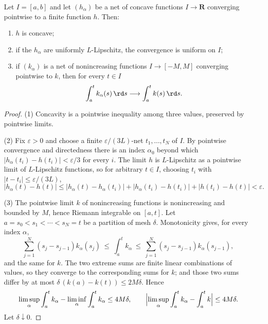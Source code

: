 \begin{lemma}
\label{lem:ch27-concave-nets}
Let \(I=[a,b]\) and let \((h_\alpha)\) be a net of concave functions
\(I\to\mathbf R\) converging pointwise to a finite function \(h\).  Then:
\begin{enumerate}
\item \(h\) is concave;
\item if the \(h_\alpha\) are uniformly \(L\)-Lipschitz, the convergence is
uniform on \(I\);
\item if \((k_\alpha)\) is a net of nonincreasing functions
\(I\to[-M,M]\) converging pointwise to \(k\), then for every
\(t\in I\)
\begin{equation}\label{eq:ch27-helly-integral}
 \int_a^tk_\alpha(s)\,\rd s\longrightarrow\int_a^tk(s)\,\rd s .
\end{equation}
\end{enumerate}
\end{lemma}

\begin{proof}
(1) Concavity is a pointwise inequality among three values, preserved by
pointwise limits.

(2) Fix \(\varepsilon>0\) and choose a finite \(\varepsilon/(3L)\)-net
\(t_1,\dots,t_N\) of \(I\).  By pointwise convergence and directedness there
is an index \(\alpha_0\) beyond which \(|h_\alpha(t_i)-h(t_i)|<\varepsilon/3\)
for every \(i\).  The limit \(h\) is \(L\)-Lipschitz as a pointwise limit of
\(L\)-Lipschitz functions, so for arbitrary \(t\in I\), choosing \(t_i\)
with \(|t-t_i|\leq\varepsilon/(3L)\),
\[
 |h_\alpha(t)-h(t)|
 \leq|h_\alpha(t)-h_\alpha(t_i)|+|h_\alpha(t_i)-h(t_i)|+|h(t_i)-h(t)|
 <\varepsilon .
\]

(3) The pointwise limit \(k\) of nonincreasing functions is nonincreasing
and bounded by \(M\), hence Riemann integrable on \([a,t]\).  Let
\(a=s_0<s_1<\cdots<s_N=t\) be a partition of mesh \(\delta\).  Monotonicity
gives, for every index \(\alpha\),
\[
 \sum_{j=1}^N(s_j-s_{j-1})k_\alpha(s_j)
 \ \leq\ \int_a^tk_\alpha
 \ \leq\ \sum_{j=1}^N(s_j-s_{j-1})k_\alpha(s_{j-1}),
\]
and the same for \(k\).  The two extreme sums are finite linear
combinations of values, so they converge to the corresponding sums for
\(k\); and those two sums differ by at most
\(\delta\,(k(a)-k(t))\leq2M\delta\).  Hence
\[
 \limsup_\alpha\int_a^tk_\alpha-\liminf_\alpha\int_a^tk_\alpha\leq4M\delta,
 \qquad
 \Bigl|\limsup_\alpha\int_a^tk_\alpha-\int_a^tk\Bigr|\leq4M\delta .
\]
Let \(\delta\downarrow0\).
\end{proof}

